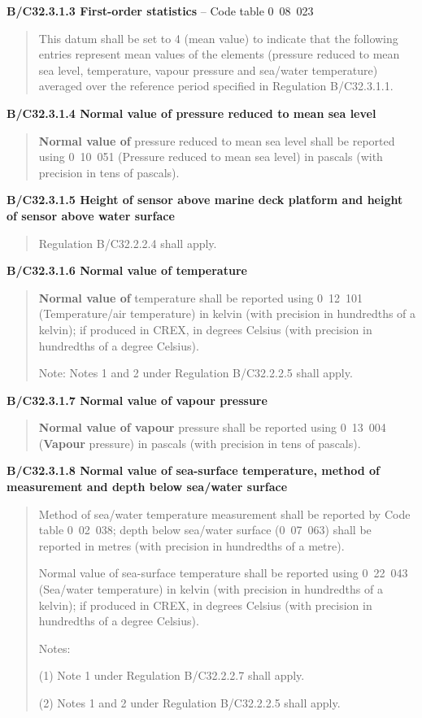 \textbf{B/C32.3.1.3 First-order statistics} -- Code table 0~08~023

\begin{quote}
This datum shall be set to 4 (mean value) to indicate that the following entries represent mean values of the elements (pressure reduced to mean sea level, temperature, vapour pressure and sea/water temperature) averaged over the reference period specified in Regulation B/C32.3.1.1.
\end{quote}

\textbf{B/C32.3.1.4 Normal value of pressure reduced to mean sea level}

\begin{quote}
\textbf{Normal value of} pressure reduced to mean sea level shall be reported using 0~10~051 (Pressure reduced to mean sea level) in pascals (with precision in tens of pascals).
\end{quote}

\textbf{B/C32.3.1.5 Height of sensor above marine deck platform and height of sensor above water surface}

\begin{quote}
Regulation B/C32.2.2.4 shall apply.
\end{quote}

\textbf{B/C32.3.1.6 Normal value of temperature}

\begin{quote}
\textbf{Normal value of} temperature shall be reported using 0~12~101 (Temperature/air temperature) in kelvin (with precision in hundredths of a kelvin); if produced in CREX, in degrees Celsius (with precision in hundredths of a degree Celsius).

Note: Notes 1 and 2 under Regulation B/C32.2.2.5 shall apply.
\end{quote}

\textbf{B/C32.3.1.7 Normal value of vapour pressure}

\begin{quote}
\textbf{Normal value of vapour} pressure shall be reported using 0~13~004 (\textbf{Vapour} pressure) in pascals (with precision in tens of pascals).
\end{quote}

\textbf{B/C32.3.1.8 Normal value of sea-surface temperature, method of measurement and depth below sea/water surface}

\begin{quote}
Method of sea/water temperature measurement shall be reported by Code table 0~02~038; depth below sea/water surface (0~07~063) shall be reported in metres (with precision in hundredths of a metre).

Normal value of sea-surface temperature shall be reported using 0~22~043 (Sea/water temperature) in kelvin (with precision in hundredths of a kelvin); if produced in CREX, in degrees Celsius (with precision in hundredths of a degree Celsius).

Notes:

(1) Note 1 under Regulation B/C32.2.2.7 shall apply.

(2) Notes 1 and 2 under Regulation B/C32.2.2.5 shall apply.
\end{quote}

